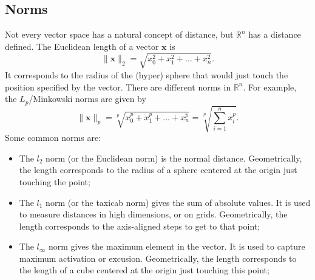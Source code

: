 \documentclass[a4paper, openany]{memoir}
\begin{document}
    \subsection{Norms}
    Not every vector space has a natural concept of distance, but $\mathbb{R}^n$ has a distance defined. The Euclidean length of a vector $\mathbf{x}$ is
    \[\lVert \mathbf{x} \rVert_2 = \sqrt{x_0^2 + x_1^2 + \dots + x_n^2}.\]
    It corresponds to the radius of the (hyper) sphere that would just touch the position specified by the vector. There are different norms in $\mathbb{R}^n$. For example, the $L_p$/Minkowski norms are given by
    \[\lVert \mathbf{x} \rVert_p = \sqrt[p]{x_0^p + x_1^p + \dots + x_n^p} = \sqrt[p]{\sum_{i=1}^{n} x_i^p}.\]
    Some common norms are:
    \begin{itemize}
        \item The $l_2$ norm (or the Euclidean norm) is the normal distance. Geometrically, the length corresponds to the radius of a sphere centered at the origin just touching the point;
        \item The $l_1$ norm (or the taxicab norm) gives the sum of absolute values. It is used to measure distances in high dimensions, or on grids. Geometrically, the length corresponds to the axis-aligned steps to get to that point;
        \item The $l_\infty$ norm gives the maximum element in the vector. It is used to capture maximum activation or excusion. Geometrically, the length corresponds to the length of a cube centered at the origin just touching this point;
    \end{itemize}
    
\end{document}
